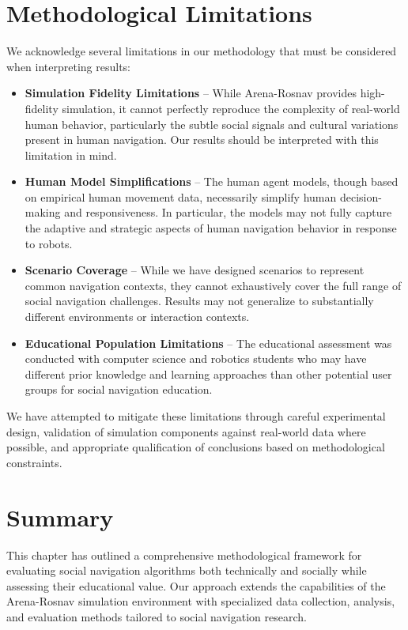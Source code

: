 \section{Methodological Limitations}
\label{sec:limitations}
We acknowledge several limitations in our methodology that must be considered 
when interpreting results:
\begin{itemize}
    \item \textbf{Simulation Fidelity Limitations} -- While Arena-Rosnav provides 
    high-fidelity simulation, it cannot perfectly reproduce the complexity of real-world 
    human behavior, particularly the subtle social signals and cultural variations present 
    in human navigation. Our results should be interpreted with this limitation in mind.
    \item \textbf{Human Model Simplifications} -- The human agent models, though based 
    on empirical human movement data, necessarily simplify human decision-making and 
    responsiveness. In particular, the models may not fully capture the adaptive and 
    strategic aspects of human navigation behavior in response to robots.
    \item \textbf{Scenario Coverage} -- While we have designed scenarios to represent 
    common navigation contexts, they cannot exhaustively cover the full range of social 
    navigation challenges. Results may not generalize to substantially different 
    environments or interaction contexts.
    \item \textbf{Educational Population Limitations} -- The educational assessment was 
    conducted with computer science and robotics students who may have different prior 
    knowledge and learning approaches than other potential user groups for social 
    navigation education.
\end{itemize}
We have attempted to mitigate these limitations through careful experimental design, 
validation of simulation components against real-world data where possible, and 
appropriate qualification of conclusions based on methodological constraints.




\section{Summary}
\label{sec:methodology_summary}
This chapter has outlined a comprehensive methodological framework for evaluating 
social navigation algorithms both technically and socially while assessing their 
educational value. Our approach extends the capabilities of the Arena-Rosnav 
simulation environment with specialized data collection, analysis, and evaluation 
methods tailored to social navigation research.

